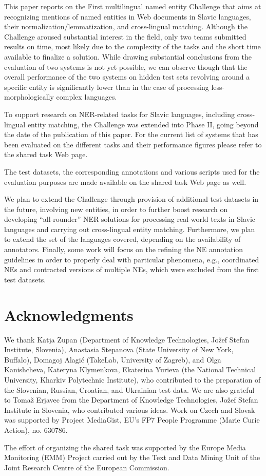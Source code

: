 \documentclass[11pt]{article}
\begin{document}
This paper reports on the First multilingual named entity Challenge that
aims at recognizing mentions of named entities in Web documents in Slavic
languages, their normalization/lemmatization, and cross-lingual matching.
Although the Challenge aroused substantial interest in the field, only
two teams submitted results on time, most likely due to the complexity of
the tasks and the short time available to finalize a solution.  While
drawing substantial conclusions from the evaluation of two systems is not
yet possible, we can observe though that the overall performance of the
two systems on hidden test sets revolving around a specific entity is
significantly lower than in the case of processing less-morphologically
complex languages.

To support research on NER-related tasks for Slavic languages, including
cross-lingual entity matching, the Challenge was extended into Phase II,
going beyond the date of the publication of this paper.  For the current
list of systems that has been evaluated on the different tasks and their
performance figures please refer to the shared task Web page.

The test datasets, the corresponding annotations and various scripts used
for the evaluation purposes are made available on the shared task Web
page as well.

We plan to extend the Challenge through provision of additional test
datasets in the future, involving new entities, in order to further boost
research on developing ``all-rounder'' NER solutions for processing
real-world texts in Slavic languages and carrying out cross-lingual
entity matching.  Furthermore, we plan to extend the set of the languages
covered, depending on the availability of annotators.  Finally, some work
will focus on the refining the NE annotation guidelines in order to
properly deal with particular phenomena, e.g., coordinated NEs and
contracted versions of multiple NEs, which were excluded from the first
test datasets.


\section*{Acknowledgments}


We thank Katja Zupan (Department of Knowledge Technologies, Jožef Stefan
Institute, Slovenia), Anastasia Stepanova (State University of New York,
Buffalo), Domagoj Alagić (TakeLab, University of Zagreb), and Olga
Kanishcheva, Kateryna Klymenkova, Ekaterina Yurieva (the National
Technical University, Kharkiv Polytechnic Institute), who contributed to
the preparation of the Slovenian, Russian, Croatian, and Ukrainian test
data.  
%
We are also grateful to Tomaž Erjavec from the Department of Knowledge
Technologies, Jožef Stefan Institute in Slovenia, who contributed various
ideas.
%
Work on Czech and Slovak was supported by Project MediaGist, EU's FP7
People Programme (Marie Curie Action), no. 630786.

The effort of organizing the shared task was supported by the Europe Media Monitoring (EMM) 
Project carried out by the Text and Data Mining Unit of the Joint Research Centre of the 
European Commission.



\end{document}

